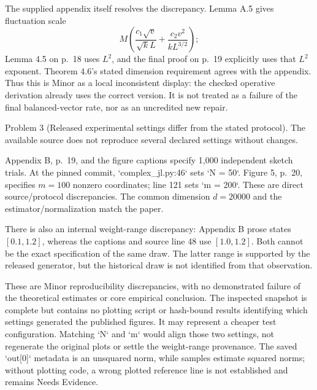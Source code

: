 \documentclass[10pt]{article}
\begin{document}
The supplied appendix itself resolves the discrepancy. Lemma A.5 gives fluctuation scale \[M\left(\frac{c_1\sqrt v}{\sqrt{k}L}
       +\frac{c_2v^2}{kL^{3/2}}\right);\] Lemma 4.5 on p. 18 uses \(L^2\), and the final proof on p. 19 explicitly uses that \(L^2\) exponent. Theorem 4.6’s stated dimension requirement agrees with the appendix. Thus this is Minor as a local inconsistent display: the checked operative derivation already uses the correct version. It is not treated as a failure of the final balanced-vector rate, nor as an uncredited new repair.\par
Problem 3 (Released experimental settings differ from the stated protocol).  The available source does not reproduce several declared settings without changes.\par
Appendix B, p. 19, and the figure captions specify 1,000 independent sketch trials. At the pinned commit, `complex\_jl.py:46` sets `N = 50`. Figure 5, p. 20, specifies \(m=100\) nonzero coordinates; line 121 sets `m = 200`. These are direct source/protocol discrepancies. The common dimension \(d=20000\) and the estimator/normalization match the paper.\par
There is also an internal weight-range discrepancy: Appendix B prose states \([0.1,1.2]\), whereas the captions and source line 48 use \([1.0,1.2]\). Both cannot be the exact specification of the same draw. The latter range is supported by the released generator, but the historical draw is not identified from that observation.\par
These are Minor reproducibility discrepancies, with no demonstrated failure of the theoretical estimates or core empirical conclusion. The inspected snapshot is complete but contains no plotting script or hash-bound results identifying which settings generated the published figures. It may represent a cheaper test configuration. Matching `N` and `m` would align those two settings, not regenerate the original plots or settle the weight-range provenance. The saved `out[0]` metadata is an unsquared norm, while samples estimate squared norms; without plotting code, a wrong plotted reference line is not established and remains Needs Evidence.\par
\end{document}
